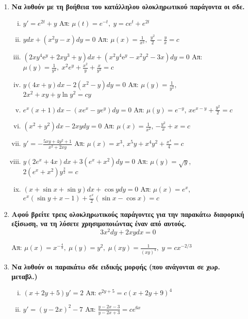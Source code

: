 \begin{enumerate}
    \item {\bfseries Να λυθούν με τη βοήθεια του κατάλληλου ολοκληρωτικού 
      παράγοντα οι σδε.}
      \begin{enumerate}[i)]
        \item $ y' = e^{2t}+y $ \hfill Απ: $ \mu (t) = e^{-t}, \; y=ce^{t}+e^{2t} $ 
        \item $ ydx+(x^{2}y-x)dy=0 $ \hfill Απ: $ \mu (x) = \frac{1}{x^{2}}, \;
          \frac{y^{2}}{2} - \frac{y}{x} = c $ 
        \item $ (2xy^{4} \mathrm{e}^{y} + 2xy^{3}+y)dx + (x^{2}y^{4}\mathrm{e}^{y} -
          x^{2}y^{2}-3x)dy=0 $ \hfill Απ: $ \mu (y) = \frac{1}{y^{4}}, \; x^{2}e^{y}+
          \frac{x^{2}}{y} + \frac{x}{y^{3}} =c $ 
        \item $ y(4x+y)dx-2(x^{2}-y)dy=0 $ 
          \hfill Απ: $ \mu(y)= \frac{1}{y^{2}} $, $ 2x^{2}+xy+ y \ln{y^{2}} =cy$ 
        \item $ e^{x}(x+1)dx - (xe^{x}-ye^{y})dy = 0 $ 
          \hfill Απ: $ \mu(y) = e^{-y} $, $xe^{x-y} + \frac{y^{2}}{2} = c $
        \item $ (x^{2}+y^{2})dx - 2xydy = 0 $ 
          \hfill Απ: $ \mu(x)= \frac{1}{x^{2}} $, $ - \frac{y^{2}}{x} + x = c $
        \item $ y' =- \frac{5xy+4y^{2}+1}{x^{2}+2xy} $ 
          \hfill Απ: $ \mu(x)=x^{3} $, $ x^{5}y+x^{4}y^{2} + \frac{x^{4}}{4} = c $ 
        \item $ y(2e^{x}+4x)dx + 3(e^{x}+x^{2})dy = 0 $ 
          \hfill Απ: $ \mu(y)= \sqrt{ y } $, $ 2(e^{x}+x^{2})y^{\frac{3}{2}}=c $ 
        \item $ (x + \sin{x} + \sin{y})dx + \cos{y} dy =0 $ 
          \hfill Απ: $\mu(x)=e^{x} $, $ e^x(\sin{y} + x-1) + \frac{e^{x}}{2} 
          (\sin{x} - \cos{x})=c $
      \end{enumerate}

    \item {\bfseries Αφού βρείτε τρεις ολοκληρωτικούς παράγοντες για την 
      παρακάτω διαφορική εξίσωση, να τη λύσετε χρησιμοποιώντας έναν από αυτούς.}
      \[
        3x^{2}dy+2xydx=0 
      \] 

      \hfill Απ:  $ \mu (x) = x^{-\frac{4}{3}}, \; \mu (y) = y^{2}, \; \mu (xy) =
      \frac{1}{(xy)^{4}}, \; y=cx^{-2/3} $

    \item {\bfseries Να λυθούν οι παρακάτω σδε ειδικής μορφής 
      (που ανάγονται σε χωρ.  μεταβλ.)}
      \begin{enumerate}[i)]
        \item $ (x+2y+5)y'=2 $ \hfill Απ: $ \mathrm{e}^{2y+5} = c(x+2y+9)^{4} $ 
        \item $ y'= (y-2x)^{2}-7 $ \hfill Απ: $ \frac{y-2x-3}{y-2x+3} = ce^{6x} $ 
      \end{enumerate}
  \end{enumerate}

        
  

